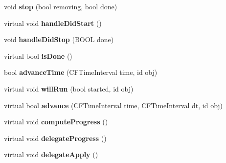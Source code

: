 \begin{DoxyCompactItemize}
\mbox{\label{struct___p_o_p_animation_state_aa757250389df94b8bdf0549d4586a8ba}} 
void {\bfseries stop} (bool removing, bool done)
\item 
\mbox{\label{struct___p_o_p_animation_state_a0de061282ce85f8ea81380ee55bbbbb7}} 
virtual void {\bfseries handle\+Did\+Start} ()
\item 
\mbox{\label{struct___p_o_p_animation_state_aff39701a5607d7cbaa045837ee10b050}} 
void {\bfseries handle\+Did\+Stop} (B\+O\+OL done)
\item 
\mbox{\label{struct___p_o_p_animation_state_ac4f667741a5a437de04918389b3b6a5b}} 
virtual bool {\bfseries is\+Done} ()
\item 
\mbox{\label{struct___p_o_p_animation_state_ad31f99b08242fd61384a98b36e6c5c99}} 
bool {\bfseries advance\+Time} (C\+F\+Time\+Interval time, id obj)
\item 
\mbox{\label{struct___p_o_p_animation_state_aa326848321f16cb0de62809e167d1ccc}} 
virtual void {\bfseries will\+Run} (bool started, id obj)
\item 
\mbox{\label{struct___p_o_p_animation_state_a8a908ccc43dc91b93a4370d6c79810a9}} 
virtual bool {\bfseries advance} (C\+F\+Time\+Interval time, C\+F\+Time\+Interval dt, id obj)
\item 
\mbox{\label{struct___p_o_p_animation_state_af0028cdf0e286fb98017e4730846fb14}} 
virtual void {\bfseries compute\+Progress} ()
\item 
\mbox{\label{struct___p_o_p_animation_state_a2fdf3bf5e42664f42304b791ab8819fe}} 
virtual void {\bfseries delegate\+Progress} ()
\item 
\mbox{\label{struct___p_o_p_animation_state_aca20c7adc6409f58b7d4fbc128b0283d}} 
virtual void {\bfseries delegate\+Apply} ()
\item 

\end{DoxyCompactItemize}
